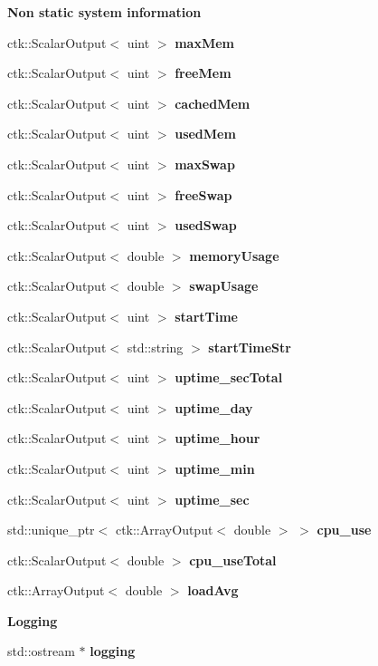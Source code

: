 \begin{Indent}{\bf Non static system information}\par
\begin{DoxyCompactItemize}
\item 
ctk\+::\+Scalar\+Output$<$ uint $>$ {\bfseries max\+Mem}
\item 
ctk\+::\+Scalar\+Output$<$ uint $>$ {\bfseries free\+Mem}
\item 
ctk\+::\+Scalar\+Output$<$ uint $>$ {\bfseries cached\+Mem}
\item 
ctk\+::\+Scalar\+Output$<$ uint $>$ {\bfseries used\+Mem}
\item 
ctk\+::\+Scalar\+Output$<$ uint $>$ {\bfseries max\+Swap}
\item 
ctk\+::\+Scalar\+Output$<$ uint $>$ {\bfseries free\+Swap}
\item 
ctk\+::\+Scalar\+Output$<$ uint $>$ {\bfseries used\+Swap}
\item 
ctk\+::\+Scalar\+Output$<$ double $>$ {\bfseries memory\+Usage}
\item 
ctk\+::\+Scalar\+Output$<$ double $>$ {\bfseries swap\+Usage}
\item 
ctk\+::\+Scalar\+Output$<$ uint $>$ {\bfseries start\+Time}
\item 
ctk\+::\+Scalar\+Output$<$ std\+::string $>$ {\bfseries start\+Time\+Str}
\item 
ctk\+::\+Scalar\+Output$<$ uint $>$ {\bfseries uptime\+\_\+sec\+Total}
\item 
ctk\+::\+Scalar\+Output$<$ uint $>$ {\bfseries uptime\+\_\+day}
\item 
ctk\+::\+Scalar\+Output$<$ uint $>$ {\bfseries uptime\+\_\+hour}
\item 
ctk\+::\+Scalar\+Output$<$ uint $>$ {\bfseries uptime\+\_\+min}
\item 
ctk\+::\+Scalar\+Output$<$ uint $>$ {\bfseries uptime\+\_\+sec}
\item 
std\+::unique\+\_\+ptr$<$ ctk\+::\+Array\+Output$<$ double $>$ $>$ {\bfseries cpu\+\_\+use}\hypertarget{classSystemInfoModule_a7b3c7cf84e13a82bd34f3697f4b891b7}{}\label{classSystemInfoModule_a7b3c7cf84e13a82bd34f3697f4b891b7}

\item 
ctk\+::\+Scalar\+Output$<$ double $>$ {\bfseries cpu\+\_\+use\+Total}
\item 
ctk\+::\+Array\+Output$<$ double $>$ {\bfseries load\+Avg}
\end{DoxyCompactItemize}
\end{Indent}
\begin{Indent}{\bf Logging}\par
\begin{DoxyCompactItemize}
\item 
std\+::ostream $\ast$ {\bfseries logging}\hypertarget{classSystemInfoModule_a805d0f8de26592dfd9ee85c0a0fe1b74}{}\label{classSystemInfoModule_a805d0f8de26592dfd9ee85c0a0fe1b74}

\end{DoxyCompactItemize}
\end{Indent}


